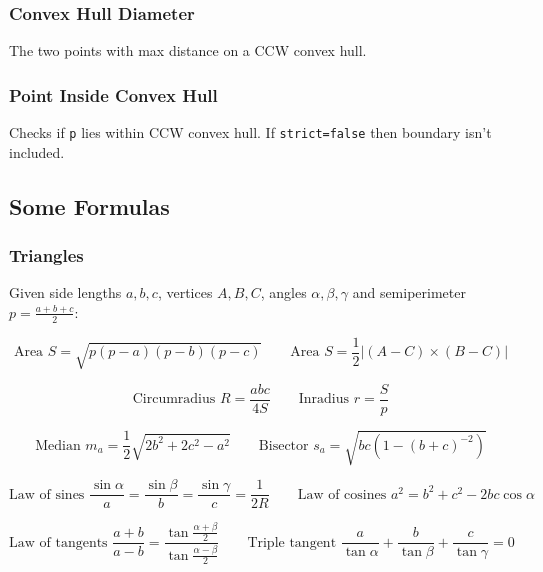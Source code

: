 \subsubsection{Convex Hull Diameter}

The two points with max distance on a CCW convex hull.

\subsubsection{Point Inside Convex Hull}

Checks if \verb|p| lies within CCW convex hull. If \verb|strict=false| then boundary isn't included.


\subsection{Some Formulas}

\subsubsection{Triangles}

Given side lengths $a, b, c$, vertices $A, B, C$, angles $\alpha, \beta, \gamma$ and semiperimeter $p = \frac{a + b + c}{2}$:

$$
\text{Area } S = \sqrt{p(p-a)(p-b)(p-c)} \hspace{2em}
\text{Area } S = \frac12 | (A - C) \times (B - C) |
$$

$$
\text{Circumradius } R = \frac{abc}{4S} \hspace{2em}
\text{Inradius } r = \frac{S}{p}
$$

$$
\text{Median } m_a = \frac12 \sqrt{2b^2 + 2c^2 - a^2}  \hspace{2em}
\text{Bisector } s_a = \sqrt{bc\left(1 - \left(b+c\right)^{-2}\right)}
$$

$$
\text{Law of sines } \frac{\sin\alpha}{a} = \frac{\sin\beta}{b} = \frac{\sin\gamma}{c} = \frac1{2R} \hspace{2em}
\text{Law of cosines } a^2 = b^2 + c^2 - 2bc\cos\alpha
$$

$$
\text{Law of tangents } \frac{a + b}{a - b} = \frac{\tan\frac{\alpha + \beta}{2}}{\tan\frac{\alpha - \beta}{2}} \hspace{2em}
\text{Triple tangent }
\frac{a}{\tan\alpha} + \frac{b}{\tan\beta} + \frac{c}{\tan\gamma} = 0
$$

